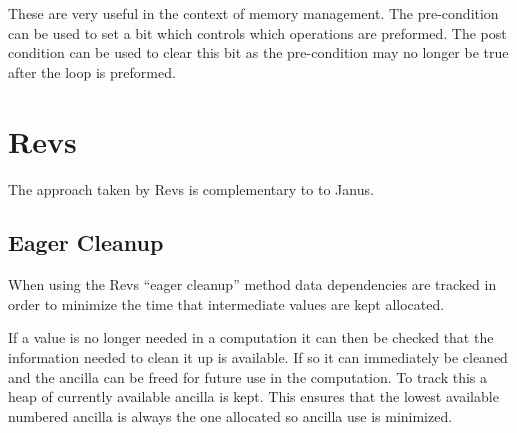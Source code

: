 These are very useful in the context of memory management.
The pre-condition can be used to set a bit which controls which operations are preformed.
The post condition can be used to clear this bit as the pre-condition may no longer be true after the loop is preformed.

\section{Revs}
The approach taken by Revs is complementary to to Janus.

\subsection{Eager Cleanup}
When using the Revs ``eager cleanup'' method data dependencies are tracked in order to minimize the time that intermediate values are kept allocated.

If a value is no longer needed in a computation it can then be checked that the information needed to clean it up is available.
If so it can immediately be cleaned and the ancilla can be freed for future use in the computation.
To track this a heap of currently available ancilla is kept.
This ensures that the lowest available numbered ancilla is always the one allocated so ancilla use is minimized.
